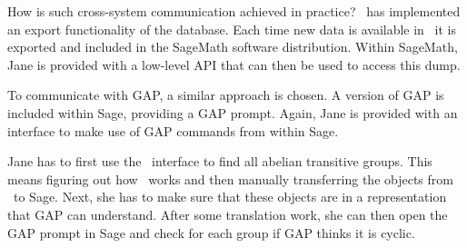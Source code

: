 
How is such cross-system communication achieved in practice?
\lmfdb\ has implemented an export functionality of the database. 
Each time new data is available in \lmfdb\ it is exported and included in the SageMath software distribution. 
Within SageMath, Jane is provided with a low-level API that can then be used to access this dump. 

To communicate with GAP, a similar approach is chosen. 
A version of GAP is included within Sage, providing a GAP prompt. 
Again, Jane is provided with an interface to make use of GAP commands from within Sage. 

Jane has to first use the \lmfdb\ interface to find all abelian transitive groups. 
This means figuring out how \lmfdb\ works and then manually transferring the objects from \lmfdb\ to Sage. 
Next, she has to make sure that these objects are in a representation that GAP can understand. 
After some translation work, she can then open the GAP prompt in Sage and check for each group if GAP thinks it is cyclic. 

